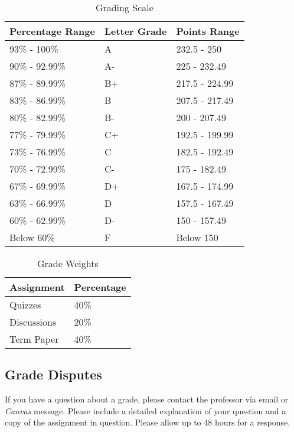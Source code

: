 \documentclass[11pt, letterpaper]{article}
\begin{document}
\begin{table}[ht]
\centering
\caption{Grading Scale}
\begin{tabular}{lll}
\toprule
\textbf{Percentage Range} & \textbf{Letter Grade} & \textbf{Points Range} \\
\midrule
93\% - 100\% & A & 232.5 - 250 \\
90\% - 92.99\% & A- & 225 - 232.49 \\
87\% - 89.99\% & B+ & 217.5 - 224.99 \\
83\% - 86.99\% & B & 207.5 - 217.49 \\
80\% - 82.99\% & B- & 200 - 207.49 \\
77\% - 79.99\% & C+ & 192.5 - 199.99 \\
73\% - 76.99\% & C & 182.5 - 192.49 \\
70\% - 72.99\% & C- & 175 - 182.49 \\
67\% - 69.99\% & D+ & 167.5 - 174.99 \\
63\% - 66.99\% & D & 157.5 - 167.49 \\
60\% - 62.99\% & D- & 150 - 157.49 \\
Below 60\% & F & Below 150 \\
\bottomrule
\end{tabular}
\label{tab:grading-scale}
\end{table}

\begin{table}[ht]
    \centering
    \caption{Grade Weights}
    \begin{tabular}{ll}
        \toprule
    \textbf{Assignment} & \textbf{Percentage} \\
    \midrule
    Quizzes & 40\% \\
    Discussions & 20\% \\
    Term Paper & 40\% \\
    \bottomrule
    \end{tabular}
    \label{tab:grade-weights}
    \end{table}

\subsection*{Grade Disputes}

If you have a question about a grade, please contact the professor via email or \emph{Canvas} message. Please include a detailed explanation of your question and a copy of the assignment in question. Please allow up to 48 hours for a response. 
\end{document}
